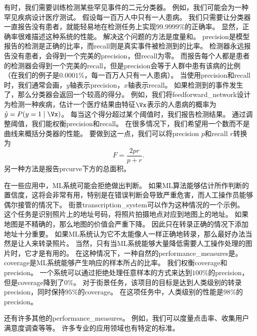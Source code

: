 有时，我们需要训练检测某些罕见事件的二元分类器。
例如，我们可能会为一种罕见疾病设计医疗测试。
假设每一百万人中只有一人患病。
我们只需要让分类器一直报告没有患者，就能轻易地在检测任务上实现$99.9999\%$的正确率。
显然，正确率很难描述这种系统的性能。
解决这个问题的方法是度量和。
\gls{precision}是模型报告的检测是正确的比率，而\gls{recall}则是真实事件被检测到的比率。
检测器永远报告没有患者，会得到一个完美的\gls{precision}，但\gls{recall}为零。
而报告每个人都是患者的检测器会得到一个完美的\gls{recall}，但是\gls{precision}会等于人群中患有该病的比例（在我们的例子是$0.0001\%$，每一百万人只有一人患病）。
当使用\gls{precision}和\gls{recall}时，我们通常会画，$y$轴表示\gls{precision}，$x$轴表示\gls{recall}。
如果检测到的事件发生了，那么分类器会返回一个较高的得分。
例如，我们将\gls{feedforward_network}设计为检测一种疾病，估计一个医疗结果由特征$\Vx$表示的人患病的概率为$\hat{y} = P(y=1\mid\Vx)$。
每当这个得分超过某个阈值时，我们报告检测结果。
通过调整阈值，我们能权衡\gls{precision}和\gls{recall}。
在很多情况下，我们希望用一个数而不是曲线来概括分类器的性能。
要做到这一点，我们可以将\gls{precision} $p$和\gls{recall} $r$转换为
\begin{equation}
	F = \frac{2pr}{p+r}.
\end{equation}
另一种方法是报告\gls{prcurve}下方的总面积。


在一些应用中，\gls{ML}系统可能会拒绝做出判断。
如果\gls{ML}算法能够估计所作判断的置信度，这将会非常有用，特别是在错误判断会导致严重危害，而人工操作员能够偶尔接管的情况下。
街景\gls{transcription_system}可以作为这种情况的一个示例。
这个任务是识别照片上的地址号码，将照片拍摄地点对应到地图上的地址。%
如果地图是不精确的，那么地图的价值会严重下降。
因此只在转录正确的情况下添加地址十分重要。
如果\gls{ML}系统认为它不太能像人一样正确地转录，那么最好办法当然是让人来转录照片。
当然，只有当\gls{ML}系统能够大量降低需要人工操作处理的图片时，它才是有用的。
在这种情况下，一种自然的\gls{performance_measures}是。
\gls{coverage}是\gls{ML}系统能够产生响应的样本所占的比率。
我们权衡\gls{coverage}和\gls{precision}。
一个系统可以通过拒绝处理任意样本的方式来达到$100\%$的\gls{precision}，但是\gls{coverage}降到了$0\%$。
对于街景任务，该项目的目标是达到人类级别的转录\gls{precision}，同时保持$95\%$的\gls{coverage}。
在这项任务中，人类级别的性能是$98\%$的\gls{precision}。

还有许多其他的\gls{performance_measures}。
例如，我们可以度量点击率、收集用户满意度调查等等。
许多专业的应用领域也有特定的标准。

